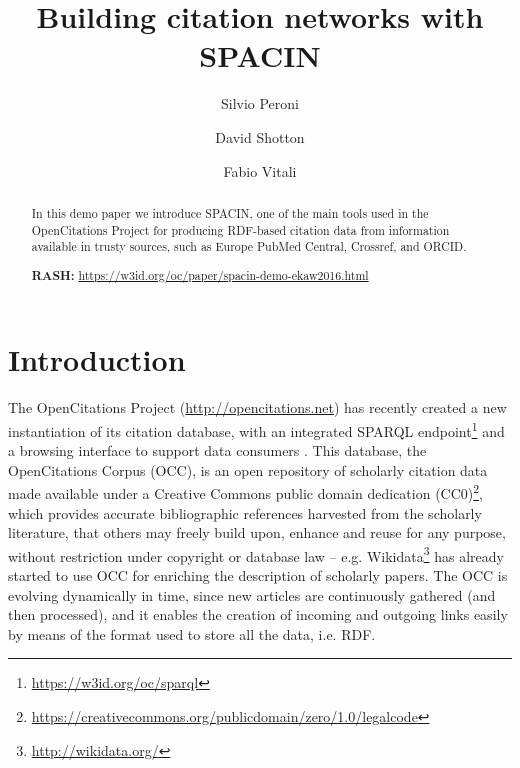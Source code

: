 \documentclass[runningheads,a4paper]{llncs}
\begin{document}
\mainmatter

\title{Building citation networks with SPACIN}

\author{Silvio Peroni \and
David Shotton \and
Fabio Vitali}
\maketitle

\begin{abstract}
In this demo paper we introduce SPACIN, one of the main tools used in the OpenCitations Project for producing RDF-based citation data from information available in trusty sources, such as Europe PubMed Central, Crossref, and ORCID.

{\bf RASH:} \url{https://w3id.org/oc/paper/spacin-demo-ekaw2016.html}

\end{abstract}


\section{Introduction}

The OpenCitations Project (\url{http://opencitations.net})  \cite{__RefNumPara__293_1852566440} has recently created a new instantiation of its citation database, with an integrated SPARQL endpoint\footnote{\url{https://w3id.org/oc/sparql}} and a browsing interface to support data consumers  \cite{__RefNumPara__14780_1591320820}. This database, the OpenCitations Corpus (OCC), is an open repository of scholarly citation data made available under a Creative Commons public domain dedication (CC0)\footnote{\url{https://creativecommons.org/publicdomain/zero/1.0/legalcode}}, which provides accurate bibliographic references harvested from the scholarly literature, that others may freely build upon, enhance and reuse for any purpose, without restriction under copyright or database law -- e.g. Wikidata\footnote{\url{http://wikidata.org/}} has already started to use OCC for enriching the description of scholarly papers. The OCC is evolving dynamically in time, since new articles are continuously gathered (and then processed), and it enables the creation of incoming and outgoing links easily by means of the format used to store all the data, i.e. RDF.
\end{document}
